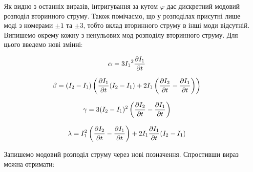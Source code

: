 Як видно з останніх виразів, інтригування за кутом $ \varphi $ дає дискретний 
модовий розподіл вторинного струму.  Також помічаємо, що у розподілах присутні 
лише моді з номерами $ \pm 1 $ та $ \pm 3 $, тобто вклад вторинного струму в 
інші моди відсутній. Випишемо окрему кожну з ненульових мод розподілу 
вторинного струму. Для цього введемо нові змінні:

\begin{equation} \begin{aligned} \label{eq:alpha}
\alpha = 3 {I_1}^2 \frac{\partial I_1}{\partial t}
\end{aligned} \end{equation}

\begin{equation} \begin{aligned} \label{eq:beta}
\beta = ( I_2 - I_1 ) \left( \frac{\partial I_1}{\partial t} ( I_2 - I_1 ) + 
2 I_1 \left( \frac{\partial I_2}{\partial t} - \frac{\partial I_1}{\partial t} \right) \right)
\end{aligned} \end{equation}

\begin{equation} \begin{aligned} \label{eq:gamma}
\gamma = 3 ( I_2 - I_1 )^2 \left( \frac{\partial I_2}{\partial t} - \frac{\partial I_1}{\partial t} \right)
\end{aligned} \end{equation}

\begin{equation} \begin{aligned} \label{eq:lambda}
\lambda = I_1^2 \left( \frac{\partial I_2}{\partial t} - 
\frac{\partial I_1}{\partial t} \right) + 2 I_1 \frac{\partial I_1}{\partial t} (I_2 - I_1)
\end{aligned} \end{equation}

Запишемо модовий розподіл струму через нові позначення. Спростивши вираз 
можна отримати:

